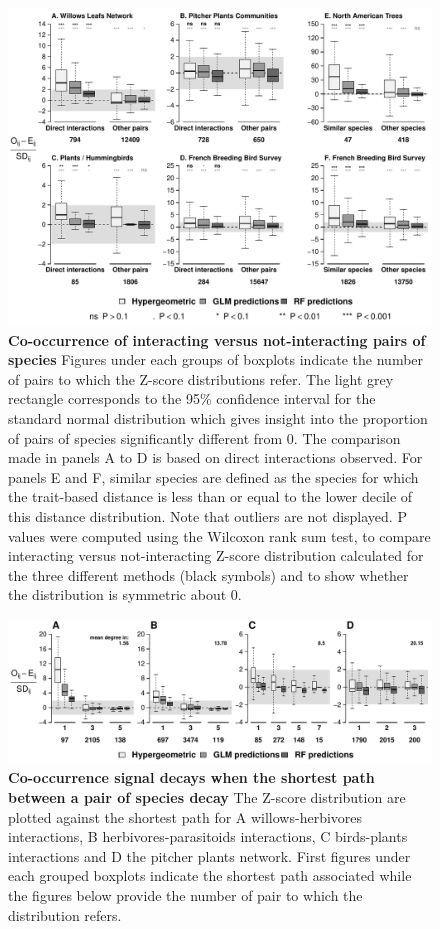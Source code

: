 \begin{figure}[htbp]
\centering
\includegraphics{chapitre3/figIntVsNoint.pdf}
\caption{\textbf{Co-occurrence of interacting versus not-interacting
pairs of species} Figures under each groups of boxplots indicate the
number of pairs to which the Z-score distributions refer. The light grey
rectangle corresponds to the 95\% confidence interval for the standard
normal distribution which gives insight into the proportion of pairs of
species significantly different from 0. The comparison made in panels A
to D is based on direct interactions observed. For panels E and F,
similar species are defined as the species for which the trait-based
distance is less than or equal to the lower decile of this distance
distribution. Note that outliers are not displayed. P values were
computed using the Wilcoxon rank sum test, to compare interacting versus
not-interacting Z-score distribution calculated for the three different
methods (black symbols) and to show whether the distribution is
symmetric about 0.\label{fig:synth}}
\end{figure}

\newpage

\begin{figure}[htbp]
\centering
\includegraphics{chapitre3/figOrder.pdf}
\caption{\textbf{Co-occurrence signal decays when the shortest path
between a pair of species decay } The Z-score distribution are plotted
against the shortest path for A willows-herbivores interactions, B
herbivores-parasitoids interactions, C birds-plants interactions and D
the pitcher plants network. First figures under each grouped boxplots
indicate the shortest path associated while the figures below provide
the number of pair to which the distribution refers.\label{fig:shtpth}}
\end{figure}


